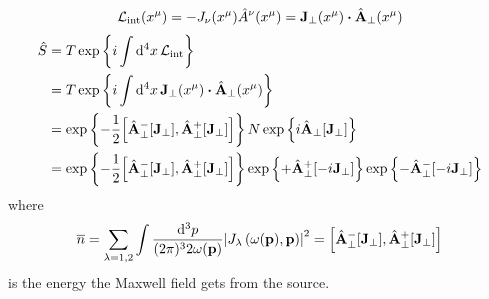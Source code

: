 \begin{equation}
	\mathcal{L}_\text{int}(x^\mu)
	=
	-
	J_\nu(x^\mu)
	\hat{A}^\nu(x^\mu)
	=
	\vb{J}_\perp(x^\mu)
	\vdot
	\hat{\vb{A}}_\perp(x^\mu)
\end{equation}
\begin{equation}
	\begin{split}
		\hat{S}
		&=
		T
		\exp\left\{
			i
			\int\dd[4]{x}
			\mathcal{L}_\text{int}
		\right\}
		\\
		&=
		T
		\exp\left\{
			i
			\int\dd[4]{x}
			\vb{J}_\perp(x^\mu)
			\vdot
			\hat{\vb{A}}_\perp(x^\mu)
		\right\}
		\\
		&=
		\exp\left\{
			-
			\frac{1}{2}
			\comm{\hat{\vb{A}}_\perp^-[\vb{J}_\perp]}{\hat{\vb{A}}_\perp^+[\vb{J}_\perp]}
		\right\}
		N\exp\left\{
			i
			\hat{\vb{A}}_\perp[\vb{J}_\perp]
		\right\}
		\\
		&=
		\exp\left\{
			-
			\frac{1}{2}
			\comm{\hat{\vb{A}}_\perp^-[\vb{J}_\perp]}{\hat{\vb{A}}_\perp^+[\vb{J}_\perp]}
		\right\}
		\exp\left\{
			+
			\hat{\vb{A}}_\perp^+[-i\vb{J}_\perp]
		\right\}
		\exp\left\{
			-
			\hat{\vb{A}}_\perp^-[-i\vb{J}_\perp]
		\right\}
	\end{split}
\end{equation}
where
\begin{equation}
	\overline{n}
	=
	\sum_{\lambda=1,2}
	\int\frac{\dd[3]{p}}{(2\pi)^32\omega(\vb{p})}
	\abs{J_\lambda\left(\omega(\vb{p}),\vb{p}\right)}^2
	=
	\comm{\hat{\vb{A}}_\perp^-[\vb{J}_\perp]}{\hat{\vb{A}}_\perp^+[\vb{J}_\perp]}
\end{equation}
is the energy the Maxwell field gets from the source.


